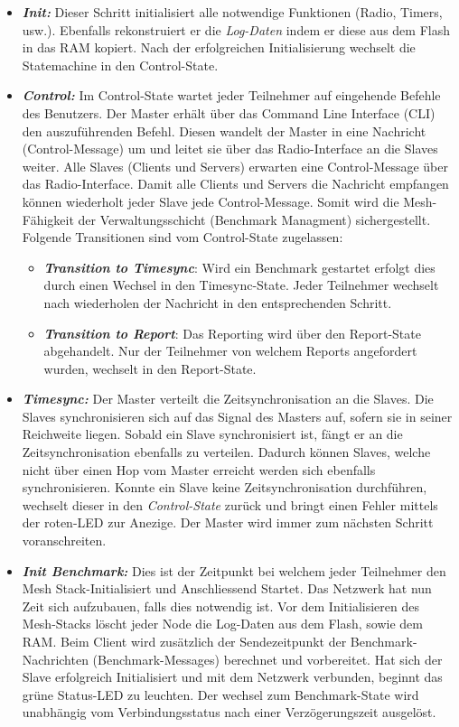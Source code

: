 \begin{itemize}
	\item \textbf{\textit{Init:}} Dieser Schritt initialisiert alle notwendige Funktionen (Radio, Timers, usw.). Ebenfalls rekonstruiert er die \textit{Log-Daten} indem er diese aus dem Flash in das RAM kopiert. Nach der erfolgreichen Initialisierung wechselt die Statemachine in den Control-State.
	\item \textbf{\textit{Control:}} Im Control-State wartet jeder Teilnehmer auf eingehende Befehle des Benutzers. Der Master erhält über das Command Line Interface (CLI) den auszuführenden Befehl. Diesen wandelt der Master in eine Nachricht (Control-Message) um und leitet sie über das Radio-Interface an die Slaves weiter.  Alle Slaves (Clients und Servers) erwarten eine Control-Message über das Radio-Interface. Damit alle Clients und Servers die Nachricht empfangen können wiederholt jeder Slave jede Control-Message. Somit wird die Mesh-Fähigkeit der Verwaltungsschicht (Benchmark Managment) sichergestellt. Folgende Transitionen sind vom Control-State zugelassen: 
	\begin{itemize}
		\item \textit{\textbf{Transition to Timesync}}: Wird ein Benchmark gestartet erfolgt dies durch einen Wechsel in den Timesync-State. Jeder Teilnehmer wechselt nach wiederholen der Nachricht in den entsprechenden Schritt. 
		\item \textit{\textbf{Transition to Report}}: Das Reporting wird über den Report-State abgehandelt. Nur der Teilnehmer von welchem Reports angefordert wurden, wechselt in den Report-State. 
	\end{itemize} 	
	\item \textbf{\textit{Timesync:}} Der Master verteilt die Zeitsynchronisation an die Slaves. Die Slaves synchronisieren sich auf das Signal des Masters auf, sofern sie in seiner Reichweite liegen. Sobald ein Slave synchronisiert ist, fängt er an die Zeitsynchronisation ebenfalls zu verteilen. Dadurch können Slaves, welche nicht über einen Hop vom Master erreicht werden sich ebenfalls synchronisieren. Konnte ein Slave keine Zeitsynchronisation durchführen, wechselt dieser in den  \textit{Control-State} zurück und bringt einen Fehler mittels der roten-LED zur Anezige. Der Master wird immer zum nächsten Schritt voranschreiten. 	
	\item \textbf{\textit{Init Benchmark:}} Dies ist der Zeitpunkt bei welchem jeder Teilnehmer den Mesh Stack-Initialisiert und Anschliessend Startet. Das Netzwerk hat nun Zeit sich aufzubauen, falls dies notwendig ist. Vor dem Initialisieren des Mesh-Stacks löscht jeder Node die Log-Daten aus dem Flash, sowie dem RAM. Beim Client wird zusätzlich der Sendezeitpunkt der Benchmark-Nachrichten (Benchmark-Messages) berechnet und vorbereitet. Hat sich der Slave erfolgreich Initialisiert und mit dem Netzwerk verbunden, beginnt das grüne Status-LED zu leuchten. Der wechsel zum Benchmark-State wird unabhängig vom Verbindungsstatus nach einer Verzögerungszeit ausgelöst. 

\end{itemize}
